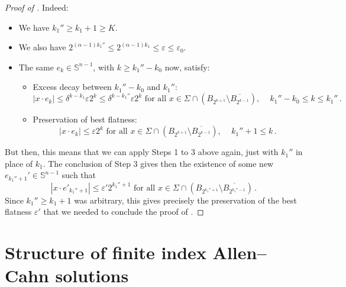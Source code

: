 \documentclass{article}
\newcommand{\Sp}{\mathbb{S}}
\newcommand{\ep}{\varepsilon}
\theoremstyle{definition}
\begin{document}
\begin{proof}[Proof of ]
Indeed:
\begin{itemize}
        \item We have $k_1''\geq k_1 +1\geq K$.
        \item We also have $2^{(\alpha-1) k_1''}\leq 2^{(\alpha-1) k_1}\leq\ep\leq \ep_0$.
        \item The same $e_k\in \Sp^{n-1}$, with $k\geq k_1''-k_0$ now, satisfy:
\begin{itemize}
    \item Excess decay between $k_1''-k_0$ and $k_1''$:
    $$|x\cdot e_{k}|\leq \delta^{k-k_1}\ep 2^{k}\leq \delta^{k-k_1''}\ep 2^{k} \mbox{ for all } x\in\Sigma\cap(B_{2^{k+1}}\setminus \overline{B_{2^{k-1}}}),\,\quad k_1''-k_0\leq k \leq k_1''\,.$$
    \item Preservation of best flatness: $$|x\cdot e_{k}|\leq \ep 2^{k} \mbox{ for all } x\in\Sigma\cap(B_{2^{k+1}}\setminus \overline{B_{2^{k-1}}}),\,\quad k_1''+1\leq k \,.$$
\end{itemize}
\end{itemize}
But then, this means that we can apply Steps 1 to 3 above again, just with $k_1''$ in place of $k_1$. The conclusion of Step 3 gives then the existence of some new $e_{k_1''+1}'\in\Sp^{n-1}$ such that
$$|x\cdot e'_{k_1''+1}|\leq \ep'2^{k_1''+1} \mbox{ for all } x\in\Sigma\cap(B_{2^{k_1''+1}}\setminus \overline{B_{2^{k_1''-1}}})\,.$$
Since $k_1''\geq k_1+1$ was arbitrary, this gives precisely the preservation of the best flatness $\ep'$ that we needed to conclude the proof of .
\end{proof}


\section{Structure of finite index Allen--Cahn solutions}\label{sec:ACstruct}
\end{document}
